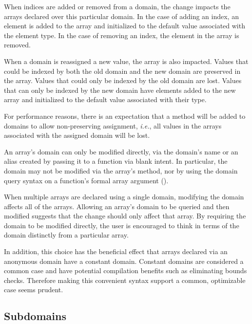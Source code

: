 When indices are added or removed from a domain, the change impacts
the arrays declared over this particular domain.  In the case of
adding an index, an element is added to the array and initialized to
the default value associated with the element type.  In the case of
removing an index, the element in the array is removed.

When a domain is reassigned a new value, the array is also impacted.
Values that could be indexed by both the old domain and the new domain
are preserved in the array.  Values that could only be indexed by the
old domain are lost.  Values that can only be indexed by the new
domain have elements added to the new array and initialized to the
default value associated with their type.

For performance reasons, there is an expectation that a method will be
added to domains to allow non-preserving assignment, \emph{i.e.}, all
values in the arrays associated with the assigned domain will be lost.

An array's domain can only be modified directly, via the domain's name
or an alias created by passing it to a function via blank intent.  In
particular, the domain may not be modified via the array's
 method, nor by using the domain query syntax on a
function's formal array argument
().

\begin{rationale}
When multiple arrays are declared using a single domain, modifying the
domain affects all of the arrays.  Allowing an array's domain to be
queried and then modified suggests that the change should only affect
that array.  By requiring the domain to be modified directly, the user
is encouraged to think in terms of the domain distinctly from a
particular array.

In addition, this choice has the beneficial effect that arrays
declared via an anonymous domain have a constant domain.  Constant
domains are considered a common case and have potential compilation
benefits such as eliminating bounds checks.  Therefore making this
convenient syntax support a common, optimizable case seems prudent.
\end{rationale}

\subsection{Subdomains}
\label{Subdomains}


